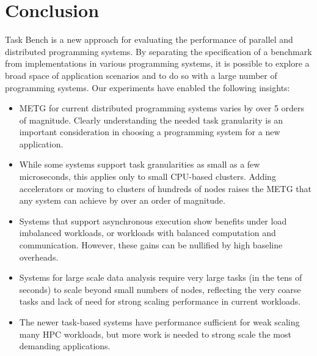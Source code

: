 \section{Conclusion}
\label{sec:conclusion}

Task Bench is a new approach for evaluating the performance of
parallel and distributed programming systems. By separating the
specification of a benchmark from implementations in various
programming systems, it is possible to explore a broad space of
application scenarios and to do so with a large number of programming
systems. Our experiments have enabled the following
insights:

\begin{itemize}

\item METG for current distributed programming systems varies by over
  5 orders of magnitude.  Clearly understanding the needed task
  granularity is an important consideration in choosing a programming
  system for a new application.

\item While some systems support task granularities as small as a few
  microseconds, this applies only to small CPU-based clusters. Adding
  accelerators or moving to clusters of hundreds of nodes raises the
  METG that any system can achieve by over an order of magnitude.

\item Systems that support asynchronous execution show benefits under
  load imbalanced workloads, or workloads with balanced computation
  and communication. However, these gains can be nullified by
  high baseline overheads.

\item Systems for large scale data analysis require very large tasks
  (in the tens of seconds) to scale beyond small numbers of nodes,
  reflecting the very coarse tasks and lack of need for strong scaling
  performance in current workloads.

\item The newer task-based systems have performance sufficient for
  weak scaling many HPC workloads, but more work is needed to strong
  scale the most demanding applications.

\end{itemize}


